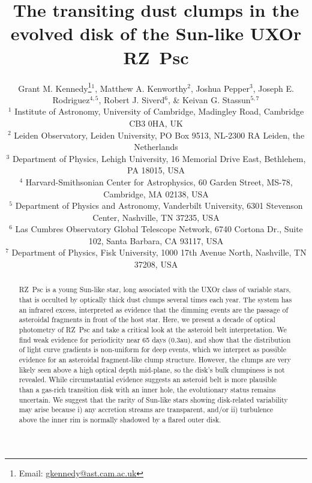 \documentclass[useAMS,usenatbib,usegraphicx]{mn2e}
\begin{document}
\title[The transiting dust clumps of RZ~Psc]{The transiting dust clumps in the evolved
  disk of the Sun-like UXOr RZ~Psc}

\author[Grant M. Kennedy et al]{Grant M. Kennedy\thanks{Email:
    \href{mailto:gkennedy@ast.cam.ac.uk}{gkennedy@ast.cam.ac.uk}}$^1$,
  Matthew A. Kenworthy$^2$,
  Joshua Pepper$^3$, \newauthor
  Joseph E. Rodriguez$^{4,5}$, 
  Robert J. Siverd$^6$, \&
  Keivan G. Stassun$^{5,7}$ \\
  $^1$ Institute of Astronomy, University of Cambridge, Madingley Road, Cambridge CB3
  0HA, UK \\
  $^2$ Leiden Observatory, Leiden University, PO Box 9513, NL-2300 RA Leiden, the
  Netherlands \\
  $^3$ Department of Physics, Lehigh University, 16 Memorial Drive East, Bethlehem, PA
  18015, USA \\
  $^4$ Harvard-Smithsonian Center for Astrophysics, 60 Garden Street, MS-78, Cambridge, MA
  02138, USA \\
  $^5$ Department of Physics and Astronomy, Vanderbilt University, 6301 Stevenson Center,
  Nashville, TN 37235, USA \\
  $^6$ Las Cumbres Observatory Global Telescope Network, 6740 Cortona Dr., Suite 102, Santa
  Barbara, CA 93117, USA \\
  $^7$ Department of Physics, Fisk University, 1000 17th Avenue North, Nashville, TN
  37208, USA \\
}
\maketitle

\begin{abstract}
  RZ~Psc is a young Sun-like star, long associated with the UXOr class of variable stars,
  that is occulted by optically thick dust clumps several times each year. The system has
  an infrared excess, interpreted as evidence that the dimming events are the passage of
  asteroidal fragments in front of the host star. Here, we present a decade of optical
  photometry of RZ~Psc and take a critical look at the asteroid belt interpretation. We
  find weak evidence for periodicity near 65 days (0.3au), and show that the distribution
  of light curve gradients is non-uniform for deep events, which we interpret as possible
  evidence for an asteroidal fragment-like clump structure. However, the clumps are very
  likely seen above a high optical depth mid-plane, so the disk's bulk clumpiness is not
  revealed. While circumstantial evidence suggests an asteroid belt is more plausible
  than a gas-rich transition disk with an inner hole, the evolutionary status remains
  uncertain. We suggest that the rarity of Sun-like stars showing disk-related
  variability may arise because i) any accretion streams are transparent, and/or ii)
  turbulence above the inner rim is normally shadowed by a flared outer disk.
\end{abstract}
\end{document}
